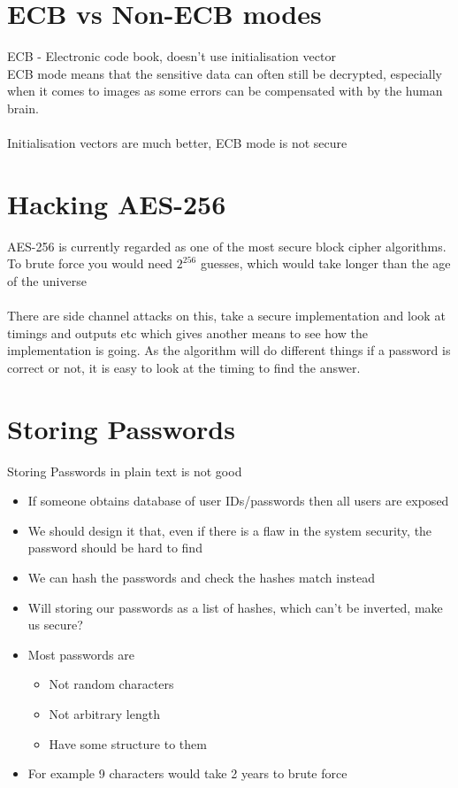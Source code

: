 \documentclass{article}[18pt]
\begin{document}
\section{ECB vs Non-ECB modes}
ECB - Electronic code book, doesn't use initialisation vector\\
ECB mode means that the sensitive data can often still be decrypted, especially when it comes to images as some errors can be compensated with by the human brain.\\
\\
Initialisation vectors are much better, ECB mode is not secure
\section{Hacking AES-256}
AES-256 is currently regarded as one of the most secure block cipher algorithms. To brute force you would need $2^{256}$ guesses, which would take longer than the age of the universe\\
\\
There are side channel attacks on this, take a secure implementation and look at timings and outputs etc which gives another means to see how the implementation is going. As the algorithm will do different things if a password is correct or not, it is easy to look at the timing to find the answer.
\section{Storing Passwords}
Storing Passwords in plain text is not good
\begin{itemize}
	\item If someone obtains database of user IDs/passwords then all users are exposed
	\item We should design it that, even if there is a flaw in the system security, the password should be hard to find
	\item We can hash the passwords and check the hashes match instead
	\item Will storing our passwords as a list of hashes, which can't be inverted, make us secure?
	\item Most passwords are
	\begin{itemize}
		\item Not random characters
		\item Not arbitrary length
		\item Have some structure to them
	\end{itemize}
	\item For example 9 characters would take 2 years to brute force
\end{itemize}
\end{document}
